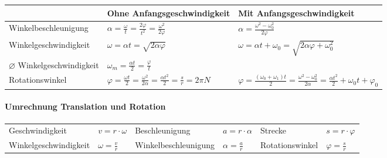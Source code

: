 \documentclass[
a4paper,
oneside,
landscape, 
8pt,
]{scrartcl}
\begin{document}
\begin{multicols*}{2}
\begin{tabbing}
	\begin{tabu} to \linewidth {l X X}
		\toprule
		& Ohne Anfangsgeschwindigkeit & Mit Anfangsgeschwindigkeit \\
		\midrule
		Winkelbeschleunigung & 
		$\alpha = \frac{\omega}{t} = \frac{2 \varphi}{t^2} = \frac{\omega^2}{2 \varphi}$ &
		$\alpha = \frac{\omega^2 - \omega_0^2}{2 \varphi}$ \\
		Winkelgeschwindigkeit & 
		$\omega = \alpha t = \sqrt{2 \alpha \varphi}$ &
		$\omega = \alpha t + \omega_0 = \sqrt{2\alpha \varphi + \omega_0^2} $ \\
		$\varnothing$ Winkelgeschwindigkeit & 
		$\omega_m = \frac{\alpha t}{2} = \frac{\varphi}{t}$ & \\
		Rotationswinkel & 
		$\varphi = \frac{\omega t}{2} = \frac{\omega^2}{2 \alpha} = \frac{\alpha t^2}{2} = \frac{s}{r} = 2\pi N$ &
		$\varphi = \frac{(\omega_0 + \omega_1)t}{2} = \frac{\omega^2 - \omega_0^2}{2 \alpha} = \frac{\alpha t^2}{2} + \omega_0 t + \varphi_0$ \\
	\end{tabu}
\end{tabbing}

\paragraph{Umrechnung Translation und Rotation}

\begin{tabbing}
	\begin{tabu} to \linewidth {l X l X l X}
		\toprule
		Geschwindigkeit & $v = r \cdot \omega$ &
		Beschleunigung & $a = r \cdot \alpha$ &
		Strecke & $s = r \cdot \varphi$ \\
		Winkelgeschwindigkeit & $\omega = \frac{v}{r}$ &
		Winkelbeschleunigung & $\alpha = \frac{a}{r}$ &
		Rotationswinkel & $\varphi = \frac{s}{r}$ \\
		\bottomrule
	\end{tabu}
\end{tabbing}


\end{multicols*}
\end{document}
